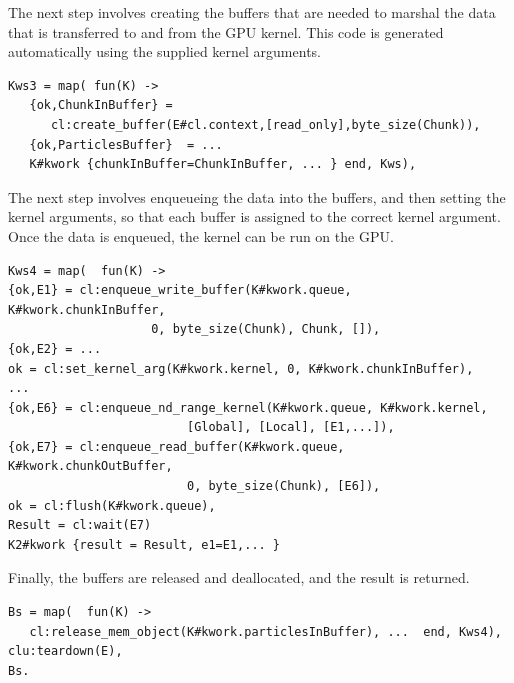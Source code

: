 \documentclass[final]{jfp1}
\begin{document}
\noindent
The next step involves creating the buffers that are needed to marshal the data
that is transferred to and from the GPU kernel. This code is generated automatically
using the supplied kernel arguments.

\begin{lstlisting}
Kws3 = map( fun(K) ->
   {ok,ChunkInBuffer} = 
      cl:create_buffer(E#cl.context,[read_only],byte_size(Chunk)),
   {ok,ParticlesBuffer}  = ...
   K#kwork {chunkInBuffer=ChunkInBuffer, ... } end, Kws),
\end{lstlisting}

\noindent
The next step involves enqueueing the data into the buffers, and then
setting the kernel arguments, so that each buffer is assigned to the
correct kernel argument.  Once the data is enqueued, the kernel can
be run on the GPU.


\begin{lstlisting}
Kws4 = map(  fun(K) ->
{ok,E1} = cl:enqueue_write_buffer(K#kwork.queue, K#kwork.chunkInBuffer,
                    0, byte_size(Chunk), Chunk, []),
{ok,E2} = ...
ok = cl:set_kernel_arg(K#kwork.kernel, 0, K#kwork.chunkInBuffer),
...
{ok,E6} = cl:enqueue_nd_range_kernel(K#kwork.queue, K#kwork.kernel, 
  					     [Global], [Local], [E1,...]),
{ok,E7} = cl:enqueue_read_buffer(K#kwork.queue, K#kwork.chunkOutBuffer,
						 0, byte_size(Chunk), [E6]),
ok = cl:flush(K#kwork.queue),
Result = cl:wait(E7) 
K2#kwork {result = Result, e1=E1,... }
\end{lstlisting}

\noindent
Finally, the buffers are released and deallocated, and the result is returned.

\noindent
\begin{lstlisting}
Bs = map(  fun(K) ->
   cl:release_mem_object(K#kwork.particlesInBuffer), ...  end, Kws4),
clu:teardown(E),
Bs.
\end{lstlisting}
\end{document}
